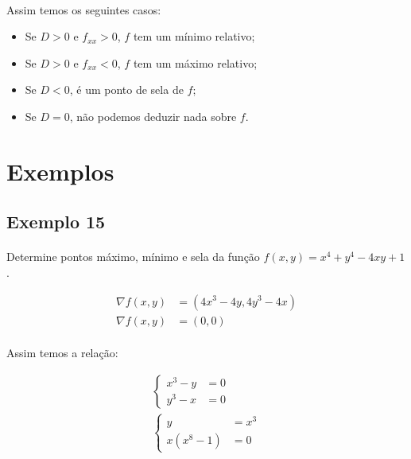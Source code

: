 \documentclass{article}
\begin{document}
            \paragraph{}
            Assim temos os seguintes casos:

            \begin{itemize}
                \item Se $D > 0$ e $f_{xx} > 0$, $f$ tem um mínimo relativo;
                \item Se $D > 0$ e $f_{xx} < 0$, $f$ tem um máximo relativo;
                \item Se $D < 0$, é um ponto de sela de $f$;
                \item Se $D = 0$, não podemos deduzir nada sobre $f$.
            \end{itemize}

    \section{Exemplos}
        \subsection{Exemplo 15}
            \paragraph{}
            Determine pontos máximo, mínimo e sela da função $f(x, y) = x^4 + y^4 - 4xy + 1$.

            \begin{align*}
                \nabla f(x, y) &= (4x^3 - 4y, 4y^3 - 4x)\\
                \nabla f(x, y) &= (0, 0)
            \end{align*}

            \paragraph{}
            Assim temos a relação:

            \begin{align*}
                \begin{cases}x^3 - y &= 0\\y^3 - x &= 0\end{cases}\\
                    \begin{cases}y &= x^3\\x (x^8 - 1) &= 0\end{cases}
            \end{align*}
\end{document}
